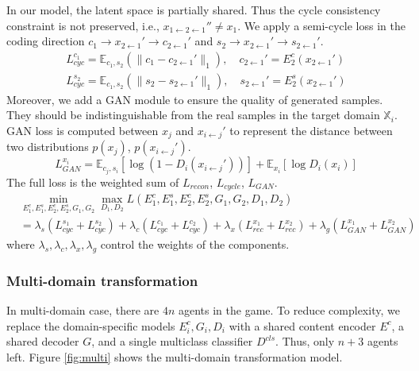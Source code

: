 \documentclass{article}
\begin{document}
In our model, the latent space is partially shared. Thus the cycle consistency constraint \cite{Zhu_2017_ICCV} is not preserved, i.e., $x_{1\leftarrow2\leftarrow1}'' \neq x_1$. We apply a semi-cycle loss in the coding direction $c_1 \rightarrow x_{2\leftarrow1}' \rightarrow c_{2\leftarrow1}'$ and $s_2 \rightarrow x_{2\leftarrow1}' \rightarrow s_{2\leftarrow1}'$.
\begin{equation}
\begin{aligned}
L_{cyc}^{c_1} = \mathbb{E}_{c_1, s_2} (\| c_1 - c_{2\leftarrow1}' \|_1), \quad c_{2\leftarrow1}'=E_2^c(x_{2\leftarrow1}') \\
L_{cyc}^{s_2} = \mathbb{E}_{c_1, s_2} (\| s_2 - s_{2\leftarrow1}' \|_1), \quad s_{2\leftarrow1}'=E_2^s(x_{2\leftarrow1}')
\end{aligned}
\end{equation}
Moreover, we add a GAN module to ensure the quality of generated samples. They should be indistinguishable from the real samples in the target domain $\mathbb{X}_i$. GAN loss is computed between $x_j$ and $x_{i\leftarrow j}'$ to represent the distance between two distributions $p(x_j)$, $p(x_{i\leftarrow j}')$.
\begin{equation}
L_{GAN}^{x_i} = \mathbb{E}_{c_j, s_i}[\log(1-D_i(x_{i\leftarrow j}'))] + \mathbb{E}_{x_i}[\log D_i(x_i)]
\end{equation}
The full loss is the weighted sum of $L_{recon}$, $L_{cycle}$, $L_{GAN}$.
\begin{equation}
\begin{aligned}
&\min_{E_1^c,E_1^s,E_2^c,E_2^s, G_1,G_2}\max_{D_1,D_2} L(E_1^c, E_1^s, E_2^c, E_2^s, G_1, G_2, D_1, D_2) \\
&= \lambda_s (L_{cyc}^{s_1} + L_{cyc}^{s_2}) + \lambda_c (L_{cyc}^{c_1} + L_{cyc}^{c_2}) + \lambda_x (L_{rec}^{x_1} + L_{rec}^{x_2}) + \lambda_g (L_{GAN}^{x_1} + L_{GAN}^{x_2})
\end{aligned}
\end{equation}
where $\lambda_s, \lambda_c, \lambda_x, \lambda_g$ control the weights of the components.


\subsubsection{Multi-domain transformation}
In multi-domain case, there are $4n$ agents in the game. To reduce complexity, we replace the domain-specific models $E^c_i, G_i, D_i$ with a shared content encoder $E^c$, a shared decoder $G$, and a single multiclass classifier $D^{cls}$. Thus, only $n+3$ agents left. Figure \ref{fig:multi} shows the multi-domain transformation model.
\end{document}
